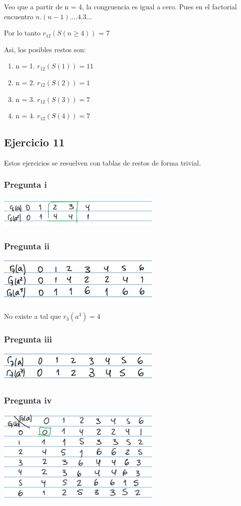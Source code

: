 Veo que a partir de n = 4, la congruencia es igual a cero. Pues en el factorial encuentro $ n.(n-1)....4.3... $

Por lo tanto $r_{12}(S(n\geq 4))$ = 7

Asi, los posibles restos son:
\begin{enumerate}
    \item n = 1. $ r_{12}(S(1)) = 11 $
    \item n = 2. $ r_{12}(S(2)) = 1 $
    \item n = 3. $ r_{12}(S(3)) = 7 $
    \item n = 4. $ r_{12}(S(4)) = 7 $
\end{enumerate}

\subsection{Ejercicio 11}
Estos ejercicios se resuelven con tablas de restos de forma trivial.

\subsubsection{Pregunta i}
\includegraphics[width=300px]{4.11.1}

\subsubsection{Pregunta ii}
\includegraphics[width=300px]{4.11.2}

No existe a tal que $ r_3(a^3) = 4$

\subsubsection{Pregunta iii}
\includegraphics[width=300px]{4.11.3}

\subsubsection{Pregunta iv}
\includegraphics[width=300px]{4.11.4}

